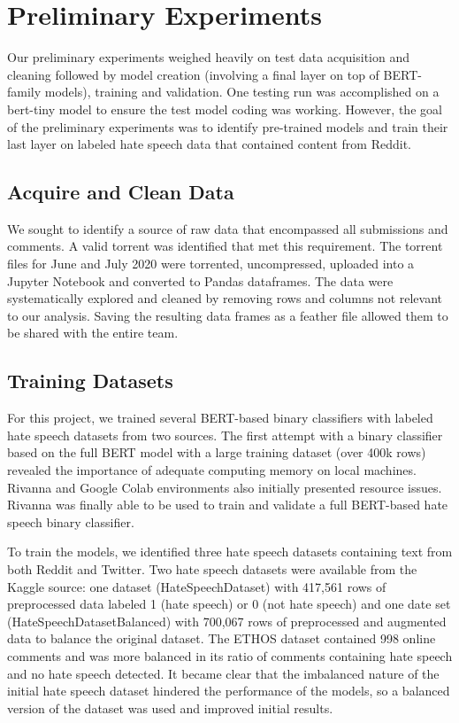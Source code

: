 \documentclass[conference]{IEEEtran}
\begin{document}
\section{Preliminary Experiments}
  Our preliminary experiments weighed heavily on test data acquisition and cleaning followed by model creation (involving a final layer on top of BERT-family models), training and validation. One testing run was accomplished on a bert-tiny model to ensure the test model coding was working. However, the goal of the preliminary experiments was to identify pre-trained models and train their last layer on labeled hate speech data that contained content from Reddit. 

\subsection{Acquire and Clean Data}
We sought to identify a source of raw data that encompassed all submissions and comments. A valid torrent was identified that met this requirement. The torrent files\cite{b18} for June and July 2020 were torrented, uncompressed, uploaded into a Jupyter Notebook and converted to Pandas dataframes. The data were systematically explored and cleaned by removing rows and columns not relevant to our analysis. Saving the resulting data frames as a feather file allowed them to be shared with the entire team. 

\subsection{Training Datasets}
 For this project, we trained several BERT-based binary classifiers with labeled hate speech datasets from two sources. The first attempt with a binary classifier based on the full BERT model with a large training dataset (over 400k rows) revealed the importance of adequate computing memory on local machines. Rivanna and Google Colab environments also initially presented resource issues. Rivanna was finally able to be used to train and validate a full BERT-based hate speech binary classifier.
 
To train the models, we identified three hate speech datasets containing text from both Reddit and Twitter. Two hate speech datasets were available from the Kaggle source: one dataset (HateSpeechDataset) with 417,561 rows of preprocessed data labeled 1 (hate speech) or 0 (not hate speech) and one date set (HateSpeechDatasetBalanced) with 700,067 rows of preprocessed and augmented data to balance the original dataset. The ETHOS dataset contained 998 online comments and was more balanced in its ratio of comments containing hate speech and no hate speech detected. It became clear that the imbalanced nature of the initial hate speech dataset hindered the performance of the models, so a balanced version of the dataset was used and improved initial results.
\end{document}
